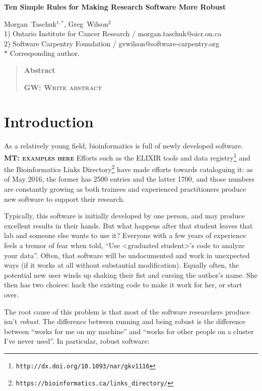 \documentclass[10pt]{article}
\date{}
\newcommand{\fixme}[2]{\textsc{\textbf{{#1}: {#2}}}}
\newcommand{\withurl}[2]{{#1}\footnote{\texttt{#2}}}
\begin{document}
\begin{flushleft}
{\Large
\textbf{Ten Simple Rules for Making Research Software More Robust}
}

{Morgan~Taschuk}$^{1,\ast}$,
{Greg~Wilson}$^{2}$
\\
1) Ontario Institute for Cancer Research / morgan.taschuk@oicr.on.ca
\\
2) Software Carpentry Foundation / gvwilson@software-carpentry.org
\\
$\ast$ Corresponding author.
\end{flushleft}


\begin{quote}
\begin{center}\textbf{Abstract}\end{center}
\fixme{GW}{Write abstract}
\end{quote}

\section*{Introduction}

As a relatively young field, bioinformatics is full of newly developed software.
\fixme{MT}{examples here}
Efforts such as
\withurl{the ELIXIR tools and data registry}{http://dx.doi.org/10.1093/nar/gkv1116}
and the
\withurl{Bioinformatics Links Directory}{https://bioinformatics.ca/links\_directory/}
\cite{brazas2012}
have made efforts towards cataloguing it: as of May 2016, the former
has 2500 entries and the latter 1700, and those numbers are constantly
growing as both trainees and experienced practitioners produce new
software to support their research.

Typically, this software is initially developed by one person, and may
produce excellent results in their hands. But what happens after that
student leaves that lab and someone else wants to use it? Everyone with
a few years of experience feels a tremor of fear when told, ``Use
{\textless}graduated student{\textgreater}'s code to analyze your
data''. Often, that software will be undocumented and work in unexpected
ways (if it works at all without substantial modification). Equally
often, the potential new user winds up shaking their fist and cursing
the author's name. She then has two choices: hack the existing code to
make it work for her, or start over.

The root cause of this problem is that most of the software researchers
produce isn't \emph{robust}. The difference between running and being
robust is the difference between ``works for me on my machine'' and
``works for other people on a cluster I've never used''. In particular,
robust software:
\end{document}
